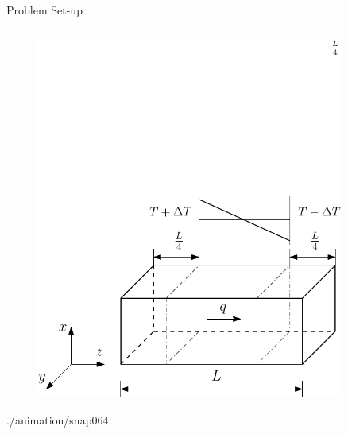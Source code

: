 \documentclass[xcolor={x11names,table},compress,svgnames,mathserif]{beamer}
\renewcommand{\(}{\begin{columns}}
\renewcommand{\)}{\end{columns}}
\newcommand{\<}[1]{\begin{column}{#1}}
\renewcommand{\>}{\end{column}}
\begin{document}
\begin{frame}{Problem Set-up}
\begin{columns}
\begin{column}{0.5\textwidth}
\begin{center}
\begin{figure}[htbp]
        \includegraphics[width=0.9\textwidth]{./Figures/schematic}
\end{figure}
\vspace{3mm}
       {./animation/snap}{0}{64}
\end{center}
\end{column}
\end{columns}

\end{frame}

\end{document}

